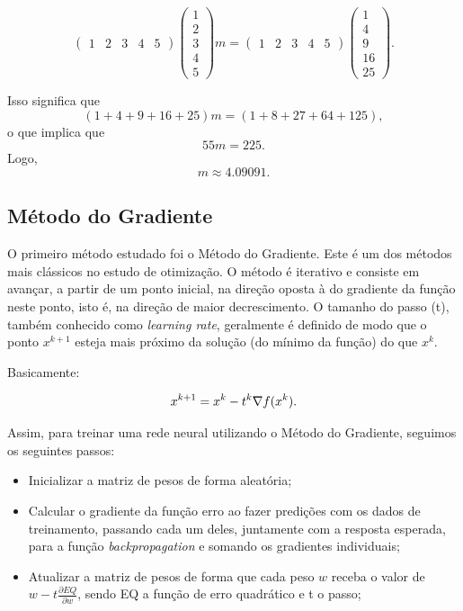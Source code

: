 \documentclass[a4paper,12pt]{article}
\begin{document}
$$\begin{pmatrix} 1&2&3&4&5
\end{pmatrix}
\begin{pmatrix} 1 \\ 2\\3\\4\\5
\end{pmatrix}m = \begin{pmatrix} 1&2&3&4&5
\end{pmatrix}\begin{pmatrix} 1 \\ 4\\9\\16\\25
\end{pmatrix}.
$$ 

Isso significa que
$$
(1 + 4 + 9 + 16 + 25)m = (1 + 8 + 27 + 64 + 125),
$$
o que implica que
$$
 55m = 225.
$$
Logo,
$$
 m \approx 4.09091.
$$



\subsection{Método do Gradiente}
O primeiro método estudado foi o Método do Gradiente. Este é um dos métodos mais clássicos no estudo de otimização. O método é iterativo e consiste em avançar, a partir de um ponto inicial, na direção oposta à do gradiente da função neste ponto, isto é, na direção de maior decrescimento. O tamanho do passo (t), também conhecido como \textit{learning rate}, geralmente é definido de modo que o ponto $x^{k+1}$ esteja mais próximo da solução (do mínimo da função) do que $x^k$.

Basicamente:

$$
    \large x^{k+1} = x^k - t^k \nabla f(x^k).
$$

Assim, para treinar uma rede neural utilizando o Método do Gradiente, seguimos os seguintes passos:
\begin{itemize}
\item Inicializar a matriz de pesos de forma aleatória;
\item Calcular o gradiente da função erro ao fazer predições com os dados de treinamento, passando cada um deles, juntamente com a resposta esperada, para a função \textit{backpropagation} e somando os gradientes individuais;
\item Atualizar a matriz de pesos de forma que cada peso $w$ receba o valor de $w - t \frac{\partial EQ}{\partial w}$, sendo EQ a função de erro quadrático e t o passo;
\end{itemize}
\end{document}
